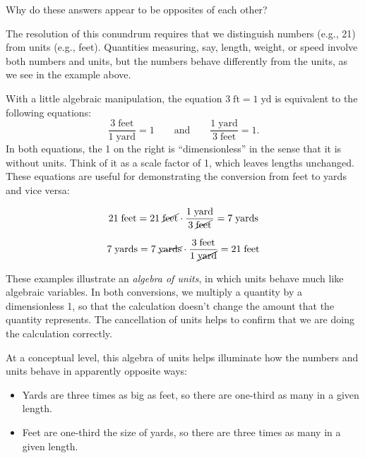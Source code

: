 \documentclass[nooutcomes]{ximera}
\begin{document}
Why do these answers appear to be opposites of each other?  

The resolution of this conundrum requires that we distinguish numbers (e.g., 21) from units (e.g., feet).  Quantities measuring, say, length, weight, or speed involve both numbers and units, but the numbers behave differently from the units, as we see in the example above.  

With a little algebraic manipulation, the equation $3\;\textrm{ft} = 1\;\textrm{yd}$ is equivalent to the following equations:  
\[
\frac{3\;\textrm{feet}}{1\;\textrm{yard}} = 1\qquad \textrm{and}\qquad \frac{1\;\textrm{yard}}{3\;\textrm{feet}} = 1.
\]
In both equations, the 1 on the right is ``dimensionless'' in the sense that it is without units.  Think of it as a scale factor of 1, which leaves lengths unchanged.  These equations are useful for demonstrating the conversion from feet to yards and vice versa:  


\[
21\;\textrm{feet} = 21\;\cancel{\textrm{feet}} \cdot \frac{{1\;\textrm{yard}}}{3\;\cancel{\textrm{feet}}} = 7\;\textrm{yards}
\]

\[
7\;\textrm{yards} = 7\;\cancel{\textrm{yards}} \cdot \frac{{3\;\textrm{feet}}}{1\;\cancel{\textrm{yard}}} = 
21\;\textrm{feet}
\]

These examples illustrate an \emph{algebra of units}, in which units behave much like algebraic variables.  In both conversions, we multiply a quantity by a dimensionless 1, so that the calculation doesn't change the amount that the quantity represents.  The cancellation of units helps to confirm that we are doing the calculation correctly.  

At a conceptual level, this algebra of units helps illuminate how the numbers and units behave in apparently opposite ways:  

\begin{itemize}
\item Yards are three times as big as feet, so there are one-third as many in a given length.  
\item Feet are one-third the size of yards, so there are three times as many in a given length.  
\end{itemize}
\end{document}

